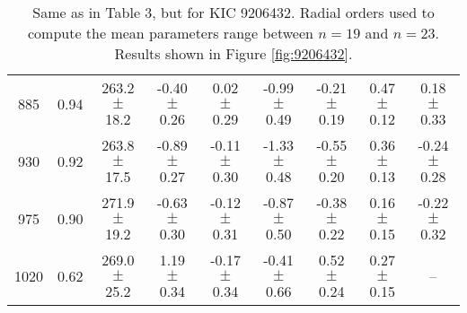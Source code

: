 \documentclass[twocolumn]{aastex61}%
\begin{document}
\begin{table*}[ht]
\begin{tabular}{ccc|ccccc|c}
885 & 0.94 & 263.2 $\pm$ 18.2 & -0.40 $\pm$ 0.26 & 0.02 $\pm$ 0.29 & -0.99 $\pm$ 0.49 & -0.21 $\pm$ 0.19 & 0.47 $\pm$ 0.12 & 0.18 $\pm$ 0.33\\
930 & 0.92 & 263.8 $\pm$ 17.5 & -0.89 $\pm$ 0.27 & -0.11 $\pm$ 0.30 & -1.33 $\pm$ 0.48 & -0.55 $\pm$ 0.20 & 0.36 $\pm$ 0.13 & -0.24 $\pm$ 0.28\\
975 & 0.90 & 271.9 $\pm$ 19.2 & -0.63 $\pm$ 0.30 & -0.12 $\pm$ 0.31 & -0.87 $\pm$ 0.50 & -0.38 $\pm$ 0.22 & 0.16 $\pm$ 0.15 & -0.22 $\pm$ 0.32\\
1020 & 0.62 & 269.0 $\pm$ 25.2 & 1.19 $\pm$ 0.34 & -0.17 $\pm$ 0.34 & -0.41 $\pm$ 0.66 & 0.52 $\pm$ 0.24 & 0.27 $\pm$ 0.15 & --\\
\end{tabular}
\caption{Same as in Table 3, but for KIC 9206432. Radial orders used to compute the mean parameters range between $n=19$ and $n=23$. Results shown in Figure \ref{fig:9206432}.}\label{tab:9206432}
\end{table*}
\end{document}
